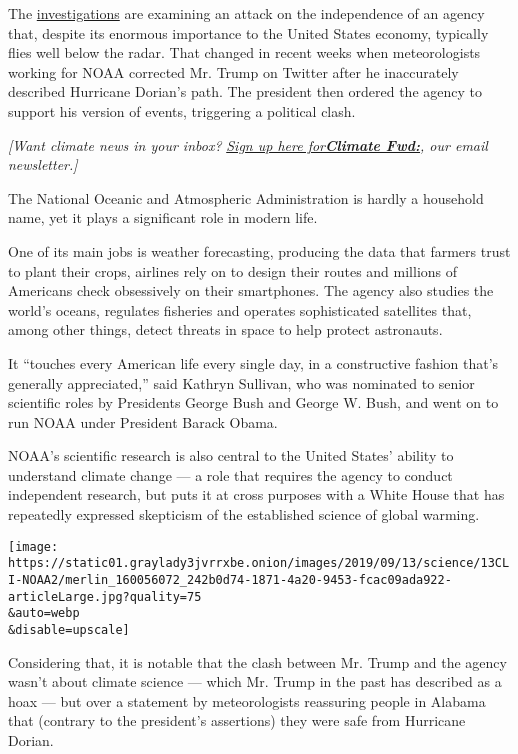 The
\href{https://www.nytimes3xbfgragh.onion/2019/09/11/climate/noaa-wilbur-ross-dorian.html?rref=collection\%2Fbyline\%2Fchristopher-flavelle\&action=click\&contentCollection=undefined\&region=stream\&module=stream_unit\&version=latest\&contentPlacement=3\&pgtype=collection}{investigations}
are examining an attack on the independence of an agency that, despite
its enormous importance to the United States economy, typically flies
well below the radar. That changed in recent weeks when meteorologists
working for NOAA corrected Mr. Trump on Twitter after he inaccurately
described Hurricane Dorian's path. The president then ordered the agency
to support his version of events, triggering a political clash.

\emph{{[}Want climate news in your inbox?}
\href{https://www.nytimes3xbfgragh.onion/newsletters/climate-change}{\emph{Sign
up here
for}}\textbf{\href{https://www.nytimes3xbfgragh.onion/newsletters/climate-change}{\emph{Climate
Fwd:}}}\emph{, our email newsletter.{]}}

The National Oceanic and Atmospheric Administration is hardly a
household name, yet it plays a significant role in modern life.

One of its main jobs is weather forecasting, producing the data that
farmers trust to plant their crops, airlines rely on to design their
routes and millions of Americans check obsessively on their smartphones.
The agency also studies the world's oceans, regulates fisheries and
operates sophisticated satellites that, among other things, detect
threats in space to help protect astronauts.

It ``touches every American life every single day, in a constructive
fashion that's generally appreciated,'' said Kathryn Sullivan, who was
nominated to senior scientific roles by Presidents George Bush and
George W. Bush, and went on to run NOAA under President Barack Obama.

NOAA's scientific research is also central to the United States' ability
to understand climate change --- a role that requires the agency to
conduct independent research, but puts it at cross purposes with a White
House that has repeatedly expressed skepticism of the established
science of global warming.

\texttt{[image: https://static01.graylady3jvrrxbe.onion/images/2019/09/13/science/13CLI-NOAA2/merlin\_160056072\_242b0d74-1871-4a20-9453-fcac09ada922-articleLarge.jpg?quality=75\\\&auto=webp\\\&disable=upscale]}

Considering that, it is notable that the clash between Mr. Trump and the
agency wasn't about climate science --- which Mr. Trump in the past has
described as a hoax --- but over a statement by meteorologists
reassuring people in Alabama that (contrary to the president's
assertions) they were safe from Hurricane Dorian.

